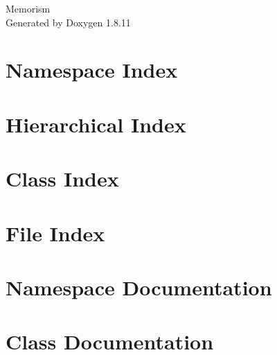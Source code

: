 \documentclass[twoside]{book}
\newcommand{\+}{\discretionary{\mbox{\scriptsize$\hookleftarrow$}}{}{}}
\newcommand{\clearemptydoublepage}{%
  \newpage{\pagestyle{empty}\cleardoublepage}%
}
\begin{document}
\hypersetup{pageanchor=false,
             bookmarksnumbered=true,
             pdfencoding=unicode
            }
\begin{titlepage}
\vspace*{7cm}
\begin{center}%
{\Large Memorism }\\
\vspace*{1cm}
{\large Generated by Doxygen 1.8.11}\\
\end{center}
\end{titlepage}
\clearemptydoublepage
\tableofcontents
\clearemptydoublepage
{}
\hypersetup{pageanchor=true}

\chapter{Namespace Index}

\chapter{Hierarchical Index}

\chapter{Class Index}

\chapter{File Index}

\chapter{Namespace Documentation}




\chapter{Class Documentation}












\end{document}
